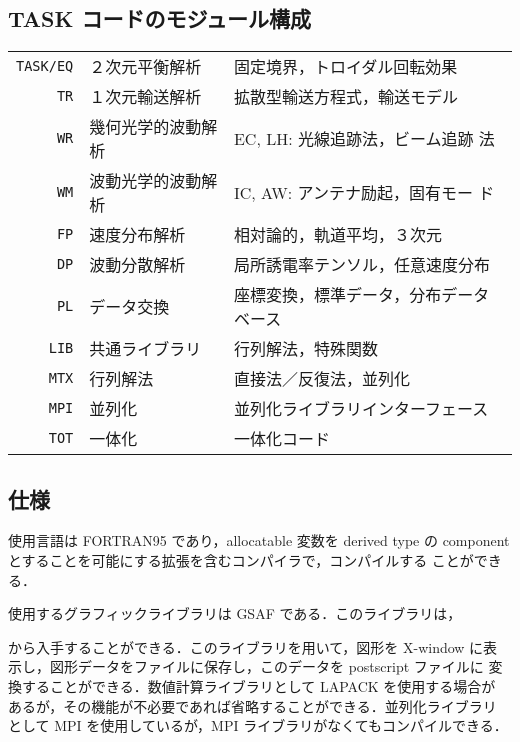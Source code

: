 \documentclass[11pt]{jarticle}
\begin{document}
\subsection{TASK コードのモジュール構成}
\begin{center}
\begin{tabular}{r|ll}
\hline
\texttt{TASK/EQ} & {２次元平衡解析} & 固定境界，トロイダル回転効果 \\[2mm]
\texttt{TR} & {１次元輸送解析} & 拡散型輸送方程式，輸送モデル \\[2mm]
\texttt{WR} & {幾何光学的波動解析} & EC, LH: 光線追跡法，ビーム追跡
法 \\[2mm]
\texttt{WM} & {波動光学的波動解析} & IC, AW: アンテナ励起，固有モー
ド \\[2mm]
\texttt{FP} & {速度分布解析} & 相対論的，軌道平均，３次元 \\[2mm]
\texttt{DP} & {波動分散解析} & 局所誘電率テンソル，任意速度分布 \\
\texttt{PL} & {データ交換} & 座標変換，標準データ，分布データベース \\[2mm]
\texttt{LIB} & {共通ライブラリ} & 行列解法，特殊関数 \\
\texttt{MTX} & {行列解法} & 直接法／反復法，並列化 \\
\texttt{MPI} & {並列化} & 並列化ライブラリインターフェース \\
\texttt{TOT} & {一体化} & 一体化コード \\
\hline
\end{tabular}
\end{center}

\subsection{仕様}

使用言語は FORTRAN95 であり，allocatable 変数を derived type の
component とすることを可能にする拡張を含むコンパイラで，コンパイルする
ことができる．

使用するグラフィックライブラリは GSAF である．このライブラリは，


から入手することができる．このライブラリを用いて，図形を X-window に表
示し，図形データをファイルに保存し，このデータを postscript ファイルに
変換することができる．数値計算ライブラリとして LAPACK を使用する場合が
あるが，その機能が不必要であれば省略することができる．並列化ライブラリ
として MPI を使用しているが，MPI ライブラリがなくてもコンパイルできる．
\end{document}
